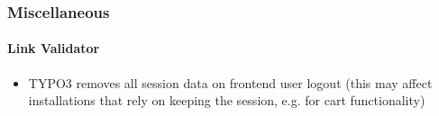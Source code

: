 %

\begin{frame}[fragile]
	\frametitle{Miscellaneous}
	\framesubtitle{Link Validator}

	\begin{itemize}
		\item TYPO3 removes all session data on frontend user logout\newline
			\small(this may affect installations that rely on keeping the session, e.g. for cart functionality)\normalsize

	\end{itemize}

\end{frame}

